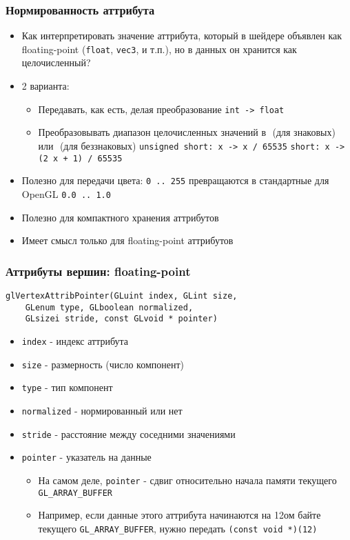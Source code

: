 \documentclass{beamer}
\begin{document}
\begin{frame}[fragile]
\frametitle{Нормированность аттрибута}
\begin{itemize}
\item Как интерпретировать значение аттрибута, который в шейдере объявлен как floating-point (\verb|float|, \verb|vec3|, и т.п.), но в данных он хранится как целочисленный?
\pause
\item 2 варианта:
\begin{itemize}
\item Передавать, как есть, делая преобразование \verb|int -> float|
\pause
\item Преобразовывать диапазон целочисленных значений в \begin{math}[-1, 1]\end{math} (для знаковых) или \begin{math}[0, 1]\end{math} (для беззнаковых)
\verb|unsigned short: x -> x / 65535|
\verb|short: x -> (2 x + 1) / 65535|
\end{itemize}
\pause
\item Полезно для передачи цвета: \verb|0 .. 255| превращаются в стандартные для OpenGL \verb|0.0 .. 1.0|
\pause
\item Полезно для компактного хранения аттрибутов
\pause
\item Имеет смысл только для floating-point аттрибутов
\end{itemize}
\end{frame}

\begin{frame}[fragile]
\frametitle{Аттрибуты вершин: floating-point}
\begin{verbatim}
glVertexAttribPointer(GLuint index, GLint size,
    GLenum type, GLboolean normalized,
    GLsizei stride, const GLvoid * pointer)
\end{verbatim}
\pause
\begin{itemize}
\item \verb|index| - индекс аттрибута
\pause
\item \verb|size| - размерность (число компонент)
\pause
\item \verb|type| - тип компонент
\pause
\item \verb|normalized| - нормированный или нет
\pause
\item \verb|stride| - расстояние между соседними значениями
\pause
\item \verb|pointer| - указатель на данные
\pause
\begin{itemize}
\item На самом деле, \verb|pointer| - сдвиг относительно начала памяти текущего \verb|GL_ARRAY_BUFFER|
\item Например, если данные этого аттрибута начинаются на 12ом байте текущего \verb|GL_ARRAY_BUFFER|, нужно передать \verb|(const void *)(12)|
\end{itemize}
\end{itemize}
\end{frame}
\end{document}
